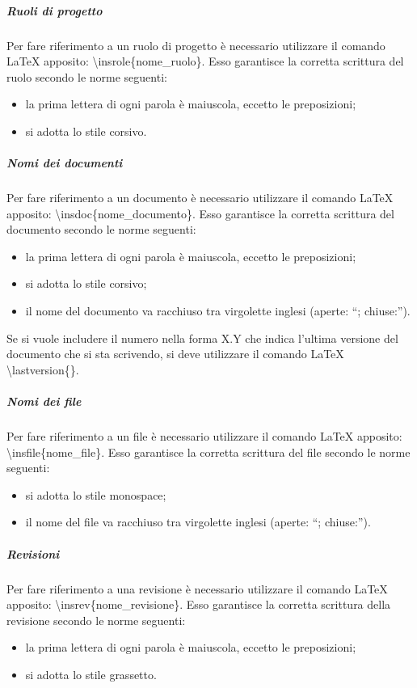 				\subparagraph{Ruoli di progetto}
					Per fare riferimento a un ruolo di progetto è necessario utilizzare il comando \LaTeX{} apposito: \textbackslash insrole\{nome\_ruolo\}. Esso garantisce la corretta scrittura del ruolo secondo le norme seguenti:
					\begin{itemize}
						\item la prima lettera di ogni parola è maiuscola, eccetto le preposizioni;
						\item si adotta lo stile corsivo.
					\end{itemize}
				\subparagraph{Nomi dei documenti}
					Per fare riferimento a un documento è necessario utilizzare il comando \LaTeX{} apposito: \textbackslash insdoc\{nome\_documento\}. Esso garantisce la corretta scrittura del documento secondo le norme seguenti:
					\begin{itemize}
						\item la prima lettera di ogni parola è maiuscola, eccetto le preposizioni;
						\item si adotta lo stile corsivo;
						\item il nome del documento va racchiuso tra virgolette inglesi (aperte: “; chiuse:”).
					\end{itemize}
					Se si vuole includere il numero nella forma X.Y che indica l’ultima versione del documento che si sta scrivendo, si deve utilizzare il comando \LaTeX{} \textbackslash lastversion\{\}.
				\subparagraph{Nomi dei file}
					Per fare riferimento a un file è necessario utilizzare il comando \LaTeX{} apposito: \textbackslash insfile\{nome\_file\}. Esso garantisce la corretta scrittura del file secondo le norme seguenti:
					\begin{itemize}
						\item si adotta lo stile monospace;
						\item il nome del file va racchiuso tra virgolette inglesi (aperte: “; chiuse:”).
					\end{itemize}
				\subparagraph{Revisioni}
					Per fare riferimento a una revisione è necessario utilizzare il comando \LaTeX{} apposito: \textbackslash insrev\{nome\_revisione\}. Esso garantisce la corretta scrittura della revisione secondo le norme seguenti:
					\begin{itemize}
						\item la prima lettera di ogni parola è maiuscola, eccetto le preposizioni;
						\item si adotta lo stile grassetto.
					\end{itemize}
